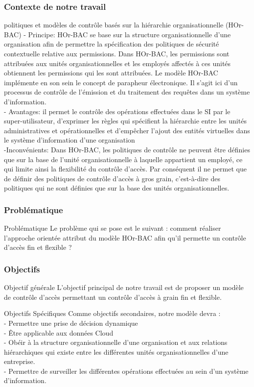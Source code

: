 \documentclass[10pt]{beamer}
\begin{document}
\begin{frame}
 \frametitle{Contexte de notre travail}
  \begin{block}{ politiques et modèles de contrôle basés sur la hiérarchie organisationnelle (HOr-BAC)}
    - Principe: HOr-BAC se base sur la structure organisationnelle d'une organisation afin de permettre la spécification des politiques de sécurité contextuelle relative aux permissions. Dans HOr-BAC, les permissions sont attribuées aux unités organisationnelles et les employés affectés à ces unités obtiennent les permissions qui les sont attribuées. Le modèle HOr-BAC implémente en son sein le concept de parapheur électronique. Il s'agit ici d'un processus de contrôle de l'émission et du traitement des requêtes dans un système d'information.\\
    - Avantages: il permet le contrôle des opérations effectuées dans le SI par le super-utilisateur, d'exprimer les règles qui spécifient la hiérarchie entre les unités administratives et opérationnelles et d'empêcher l'ajout des entités virtuelles dans le système d'information d'une organisation  
\\
    -Inconvénients: Dans HOr-BAC, les politiques de contrôle ne peuvent être définies que sur la base de l'unité organisationnelle à laquelle appartient un employé, ce qui limite ainsi la flexibilité du contrôle d'accès. Par conséquent il ne permet que de définir des politiques de contrôle d'accès à gros grain, c'est-à-dire des politiques qui ne sont définies que sur la base des unités organisationnelles. 
  \end{block}
\end{frame}

\begin{frame}
 \frametitle{Problématique}
  \begin{alertblock}{Problématique }
    Le problème qui se pose est le suivant : comment réaliser l'approche orientée attribut du modèle HOr-BAC afin qu'il permette un contrôle d'accès fin et flexible ?
  \end{alertblock}
\end{frame}

\begin{frame}
 \frametitle{Objectifs}
  \begin{block}{Objectif générale }
    L'objectif principal de notre travail est de proposer un modèle de contrôle d'accès permettant un contrôle d'accès à grain fin et flexible. 
  \end{block}
  \begin{block}{Objectifs Spécifiques }
    Comme objectifs secondaires, notre modèle devra :\\
- Permettre une prise de décision dynamique \\ 
- Être applicable  aux données Cloud \\
- Obéir à la structure organisationnelle d'une organisation et aux relations hiérarchiques qui existe entre les différentes unités organisationnelles d'une entreprise.\\
- Permettre de surveiller les différentes opérations effectuées au sein d'un système d'information.
  \end{block}
\end{frame}
\end{document}
